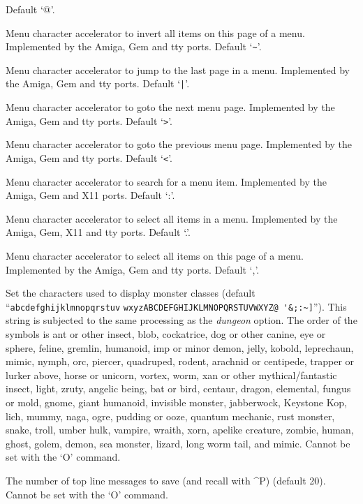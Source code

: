 Default `@'.
\item[\ib{menu\_invert\_page}]
Menu character accelerator to invert all items on this page of a menu.
Implemented by the Amiga, Gem and tty ports.
Default `\verb+~+'.
\item[\ib{menu\_last\_page}]
Menu character accelerator to jump to the last page in a menu.
Implemented by the Amiga, Gem and tty ports.
Default `\verb+|+'.
\item[\ib{menu\_next\_page}]
Menu character accelerator to goto the next menu page.
Implemented by the Amiga, Gem and tty ports.
Default `\verb+>+'.
\item[\ib{menu\_previous\_page}]
Menu character accelerator to goto the previous menu page.
Implemented by the Amiga, Gem and tty ports.
Default `\verb+<+'.
\item[\ib{menu\_search}]
Menu character accelerator to search for a menu item.
Implemented by the Amiga, Gem and X11 ports.
Default `:'.
\item[\ib{menu\_select\_all}]
Menu character accelerator to select all items in a menu.
Implemented by the Amiga, Gem, X11 and tty ports.
Default `.'.
\item[\ib{menu\_select\_page}]
Menu character accelerator to select all items on this page of a menu.
Implemented by the Amiga, Gem and tty ports.
Default `,'.
\item[\tb{monsters}]
Set the characters used to display monster classes (default
``\verb+abcdefghijklmnopqrstuv+
\verb+wxyzABCDEFGHIJKLMNOPQRSTUVWXYZ@ '&;:~]+'').
This string is subjected to the same processing as the
{\it dungeon }
option.
The order of the symbols is
ant or other insect, blob, cockatrice,
dog or other canine, eye or sphere, feline,
gremlin, humanoid, imp or minor demon,
jelly, kobold, leprechaun,
mimic, nymph, orc,
piercer, quadruped, rodent,
arachnid or centipede, trapper or lurker above, horse or unicorn,
vortex, worm, xan or other mythical/fantastic insect,
light, zruty,
angelic being, bat or bird, centaur,
dragon, elemental, fungus or mold,
gnome, giant humanoid, invisible monster,
jabberwock, Keystone Kop, lich,
mummy, naga, ogre,
pudding or ooze, quantum mechanic, rust monster,
snake, troll, umber hulk,
vampire, wraith, xorn,
apelike creature, zombie,
human, ghost, golem,
demon, sea monster, lizard,
long worm tail, and mimic.
Cannot be set with the `O' command.
\item[\tb{msghistory}]
The number of top line messages to save (and recall with \^{}P) (default 20).
Cannot be set with the `O' command.
\item[\tb{msg\_window}]
